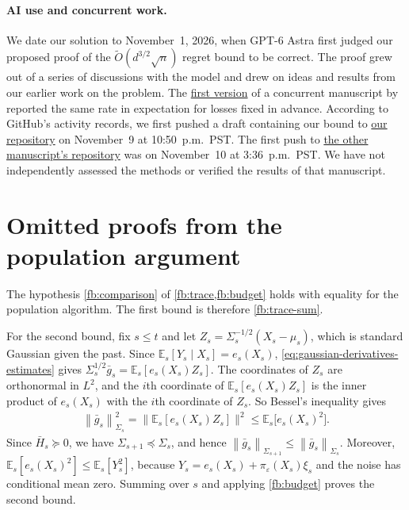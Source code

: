 \documentclass[12pt,cleveref]{jmlr}
\renewenvironment{proof}[1][\proofname]
{\par\noindent{\bfseries\upshape #1\ }}
{\jmlrQED}
\newcommand{\E}{\mathbb E}
\newcommand{\1}{\mathbf 1}
\newcommand{\eps}{\varepsilon}
\newcommand{\normm}[2]{\left\lVert #1\right\rVert_{#2}}
\begin{document}
\paragraph{AI use and concurrent work.}
We date our solution to November~1, 2026, when GPT-6 Astra first judged our proposed proof of the $\widetilde O(d^{3/2}\sqrt n)$ regret bound to be correct. The proof grew out of a series of discussions with the model and drew on ideas and results from our earlier work on the problem.
The \href{https://github.com/mt0-svg/adversarial-bco/tree/2abc77c3989eb894409e892da475b6d7316882ed}{first version} of a concurrent manuscript by \citet{mt0svg2026optimal} reported the same rate in expectation for losses fixed in advance.
According to GitHub's activity records, we first pushed a draft containing our bound to \href{https://github.com/sarb9/cvxbyopt/activity/}{our repository} on November~9 at 10:50~p.m.\ PST. The first push to \href{https://github.com/mt0-svg/adversarial-bco/activity/}{the other manuscript's repository} was on November~10 at 3:36~p.m.\ PST.
We have not independently assessed the methods or verified the results of that manuscript.

\newpage
\begingroup
\raggedright
\providecommand{\doi}[1]{\href{https://doi.org/#1}{doi:\nolinkurl{#1}}}

\endgroup

\newpage
\appendix
{}

\section{Omitted proofs from the population argument}\label{pop:appendix}

\begin{proof}[Proof of \cref{pop:sums}]
    The hypothesis \cref{fb:comparison} of \cref{fb:trace,fb:budget} holds with equality for the population algorithm. The first bound is therefore \cref{fb:trace-sum}.

    For the second bound, fix $s\leq t$ and let $Z_s=\Sigma_s^{-1/2}(X_s-\mu_s)$, which is standard Gaussian given the past. Since $\E_s[Y_s\mid X_s]=e_s(X_s)$, \cref{eq:gaussian-derivatives-estimates} gives $\Sigma_s^{1/2}\bar g_s=\E_s[e_s(X_s)Z_s]$. The coordinates of $Z_s$ are orthonormal in $L^2$, and the $i$th coordinate of $\E_s[e_s(X_s)Z_s]$ is the inner product of $e_s(X_s)$ with the $i$th coordinate of $Z_s$. So Bessel's inequality gives
    \begin{align}
        \normm{\bar g_s}{\Sigma_s}^2=\bigl\|\E_s[e_s(X_s)Z_s]\bigr\|^2\leq\E_s\bigl[e_s(X_s)^2\bigr].
    \end{align}
    Since $\bar H_s\succeq0$, we have $\Sigma_{s+1}\preceq\Sigma_s$, and hence $\normm{\bar g_s}{\Sigma_{s+1}}\leq\normm{\bar g_s}{\Sigma_s}$. Moreover, $\E_s[e_s(X_s)^2]\leq\E_s[Y_s^2]$, because $Y_s=e_s(X_s)+\pi_\eps(X_s)\xi_s$ and the noise has conditional mean zero. Summing over $s$ and applying \cref{fb:budget} proves the second bound.
\end{proof}
\end{document}

